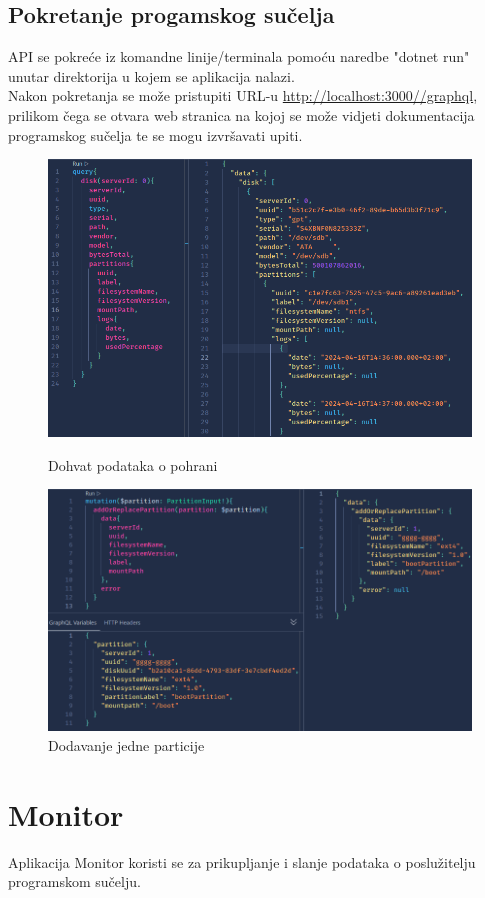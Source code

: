 \documentclass[zavrsnirad]{fer}
\begin{document}
\section{Pokretanje progamskog sučelja}
API se pokreće iz komandne linije/terminala pomoću naredbe "dotnet run" unutar direktorija u kojem se aplikacija nalazi.
\\Nakon pokretanja se može pristupiti URL-u \url{http://localhost:3000//graphql}, prilikom čega se otvara web stranica na kojoj se može vidjeti dokumentacija programskog sučelja te se mogu izvršavati upiti.
\begin{figure}[htb!]
	\centering
	\includegraphics[width=1\linewidth]{images/api_query.png} 
	\caption{Dohvat podataka o pohrani}
	\label{slk:api_query}
	\includegraphics[width=1\linewidth]{images/api_mutation.png} 
	\caption{Dodavanje jedne particije}
	\label{slk:api_mutation}
\end{figure}
\FloatBarrier

\chapter{Monitor}
Aplikacija Monitor koristi se za prikupljanje i slanje podataka o poslužitelju programskom sučelju.
\end{document}

